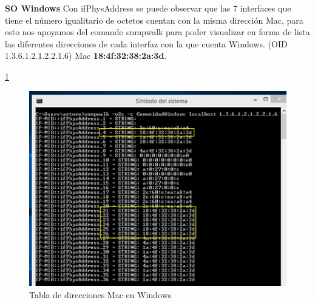\documentclass[10pt,a4paper]{book}
\begin{document}
\begin{itemize}
\textbf{SO Windows}
Con ifPhysAddress se puede observar que las 7 interfaces que tiene el número igualitario de octetos cuentan con la misma dirección Mac, para esto nos apoyamos del comando snmpwalk para poder visualizar en forma de lista las diferentes direcciones de cada interfaz con la que cuenta Windows. (OID 1.3.6.1.2.1.2.2.1.6)
Mac \textbf{18:4f:32:38:2a:3d}.

 \ref{image:Pregunta6W}
 \FloatBarrier
\begin{figure}[htbp!]
		\centering
		    \includegraphics[width=.5 \textwidth]{../images/Pregunta6W.png} 
		\caption{Tabla de direcciones Mac en Windows}
		\label{image:Pregunta6W}
\end{figure}
\FloatBarrier

\end{itemize}
\end{document}
